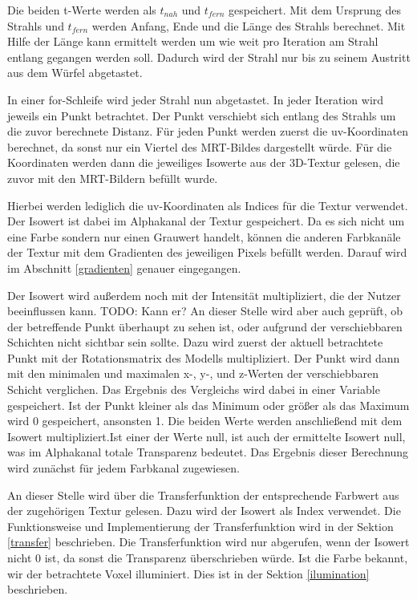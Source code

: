 Die beiden t-Werte werden als $t_{nah}$ und $t_{fern}$ gespeichert.
Mit dem Ursprung des Strahls und $t_{fern}$ werden Anfang, Ende und die Länge des Strahls berechnet. Mit Hilfe der Länge kann ermittelt werden um wie weit pro Iteration am Strahl entlang gegangen werden soll. Dadurch wird der Strahl nur bis zu seinem Austritt aus dem Würfel abgetastet. 

In einer for-Schleife wird jeder Strahl nun abgetastet. In jeder Iteration wird jeweils ein Punkt betrachtet. Der Punkt verschiebt sich entlang des Strahls um die zuvor berechnete Distanz.
Für jeden Punkt werden zuerst die uv-Koordinaten berechnet, da sonst nur ein Viertel des MRT-Bildes dargestellt würde.
Für die Koordinaten werden dann die jeweiliges Isowerte aus der 3D-Textur gelesen, die zuvor mit den MRT-Bildern befüllt wurde.

Hierbei werden lediglich die uv-Koordinaten als Indices für die Textur verwendet. 
Der Isowert ist dabei im Alphakanal der Textur gespeichert. Da es sich nicht um eine Farbe sondern nur einen Grauwert handelt, können die anderen Farbkanäle der Textur mit dem Gradienten des jeweiligen Pixels befüllt werden. Darauf wird im Abschnitt \ref{gradienten} genauer eingegangen.

Der Isowert wird außerdem noch mit der Intensität multipliziert, die der Nutzer beeinflussen kann.
TODO: Kann er?
An dieser Stelle wird aber auch geprüft, ob der betreffende Punkt überhaupt zu sehen ist, oder aufgrund der verschiebbaren Schichten nicht sichtbar sein sollte. 
Dazu wird zuerst der aktuell betrachtete Punkt mit der Rotationsmatrix des Modells multipliziert.
Der Punkt wird dann mit den minimalen und maximalen x-, y-, und z-Werten der verschiebbaren Schicht verglichen. Das Ergebnis des Vergleichs wird dabei in einer Variable gespeichert. Ist der Punkt kleiner als das Minimum oder größer als das Maximum wird 0 gespeichert, ansonsten 1. 
Die beiden Werte werden anschließend mit dem Isowert multipliziert.Ist einer der Werte null, ist auch der ermittelte Isowert null, was im Alphakanal totale Transparenz bedeutet. 
Das Ergebnis dieser Berechnung wird zunächst für jedem Farbkanal zugewiesen.

An dieser Stelle wird über die Transferfunktion der entsprechende Farbwert aus der zugehörigen Textur gelesen. Dazu wird der Isowert als Index verwendet. Die Funktionsweise und Implementierung der Transferfunktion wird in der Sektion \ref{transfer} beschrieben.
Die Transferfunktion wird nur abgerufen, wenn der Isowert nicht 0 ist, da sonst die Transparenz überschrieben würde.
Ist die Farbe bekannt, wir der betrachtete Voxel illuminiert. Dies ist in der Sektion \ref{ilumination} beschrieben. 

